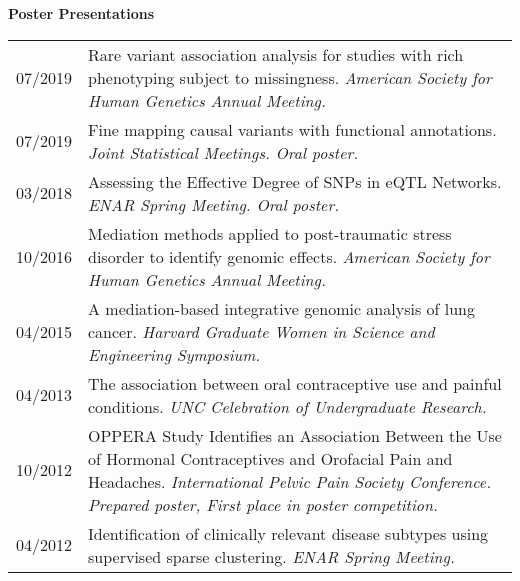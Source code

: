 \documentclass[10pt]{article}
\begin{document}
\textbf{Poster Presentations} \setlength\intextsep{0mm}
\begin{center}
	\begin{table}[H]
		\centering
		\begin{tabular}{@{}p{2cm}@{}@{}p{14.9cm}@{}}
			07/2019  & Rare variant association analysis for studies with rich phenotyping subject to missingness. \textit{American Society for Human Genetics Annual Meeting.}  \\ 
			07/2019  & Fine mapping causal variants with functional annotations. \textit{Joint Statistical Meetings. Oral poster.}  \\ 
			03/2018  & Assessing the Effective Degree of SNPs in eQTL Networks. \textit{ENAR Spring Meeting. Oral poster.}  \\ 
			10/2016  & Mediation methods applied to post-traumatic stress disorder to identify genomic effects. \textit{American Society for Human Genetics Annual Meeting. } \\ 
			04/2015  & A mediation-based integrative genomic analysis of lung cancer. \textit{Harvard Graduate Women in Science and Engineering Symposium.}    \\ 
			04/2013  & The association between oral contraceptive use and painful conditions. \textit{UNC Celebration of Undergraduate Research. }           \\ 
			10/2012  & OPPERA Study Identifies an Association Between the Use of Hormonal Contraceptives and Orofacial Pain and Headaches.\textit{ International Pelvic Pain Society Conference. Prepared poster, First place in poster competition. }      \\ 
			04/2012  & Identification of clinically relevant disease subtypes using supervised sparse clustering.  \textit{ENAR Spring Meeting. }
		\end{tabular}
	\end{table}
\end{center}
\end{document}
